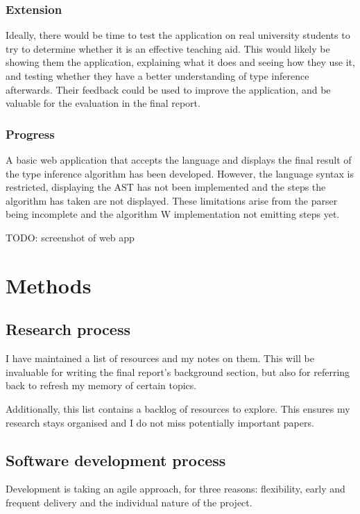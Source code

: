 \documentclass[12pt]{article}
\begin{document}
\subsubsection{Extension}

Ideally, there would be time to test the application on real university students to try to determine whether it is an effective teaching aid. This would likely be showing them the application, explaining what it does and seeing how they use it, and testing whether they have a better understanding of type inference afterwards. Their feedback could be used to improve the application, and be valuable for the evaluation in the final report.

\subsubsection{Progress}

A basic web application that accepts the language and displays the final result of the type inference algorithm has been developed. However, the language syntax is restricted, displaying the AST has not been implemented and the steps the algorithm has taken are not displayed. These limitations arise from the parser being incomplete and the algorithm W implementation not emitting steps yet.

TODO: screenshot of web app

\section{Methods}

\subsection{Research process}

I have maintained a list of resources and my notes on them. This will be invaluable for writing the final report’s background section, but also for referring back to refresh my memory of certain topics.

Additionally, this list contains a backlog of resources to explore. This ensures my research stays organised and I do not miss potentially important papers.

\subsection{Software development process}

Development is taking an agile approach, for three reasons: flexibility, early and frequent delivery and the individual nature of the project.
\end{document}
